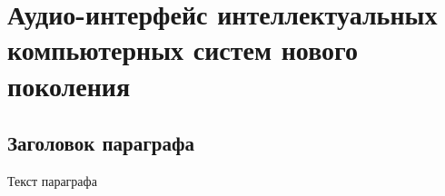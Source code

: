 
\chapter{Аудио-интерфейс интеллектуальных компьютерных систем нового поколения}
\label{chapter_audio_interfaces}


\section{Заголовок параграфа}
Текст параграфа

%